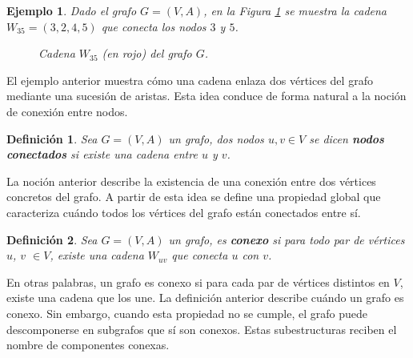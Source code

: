 \documentclass[11pt,a4paper,spanish]{report}
\theoremstyle{plain}
\newtheorem{definicion}{Definición}[chapter]
\newtheorem{ejemplo}{Ejemplo}[chapter]
\begin{document}
\begin{ejemplo}
Dado el grafo $G = (V, A)$, en la Figura \ref{fig:cadena-ejemplo} se muestra la cadena $W_{35} = (3,2,4,5)$ que conecta los nodos $3$ y $5$.
\begin{figure}[H]
\centering
{}
\caption{Cadena $W_{35}$ (en rojo) del grafo $G$.}
\label{fig:cadena-ejemplo}
\end{figure}


\end{ejemplo}
El ejemplo anterior muestra cómo una cadena enlaza dos vértices del
grafo mediante una sucesión de aristas. Esta idea conduce de forma natural a la noción de conexión entre nodos.
\begin{definicion}\cite{gross2018graph}
Sea $G=(V,A)$ un grafo, dos nodos $u,v\in V$ se dicen \textbf{ nodos conectados} si existe una cadena entre $u$ y $v$. 
\end{definicion}

La noción anterior describe la existencia de una conexión entre dos vértices
concretos del grafo. A partir de esta idea se define una propiedad global que
caracteriza cuándo todos los vértices del grafo están conectados entre sí.

\begin{definicion}\cite{gross2018graph}
Sea \( G = (V,A) \) un grafo, es \textbf{conexo} si para todo par de vértices $u$, $v$ $\in V$, existe una cadena \(W_{uv}\) que conecta $u$ con $v$. 
\end{definicion}
En otras palabras, un grafo es conexo si para cada par de vértices distintos en $V$, existe una cadena que los une.  La definición anterior describe cuándo un grafo es conexo. Sin
embargo, cuando esta propiedad no se cumple, el grafo puede descomponerse en
subgrafos que sí son conexos. Estas subestructuras reciben el nombre de componentes conexas.
\end{document}
